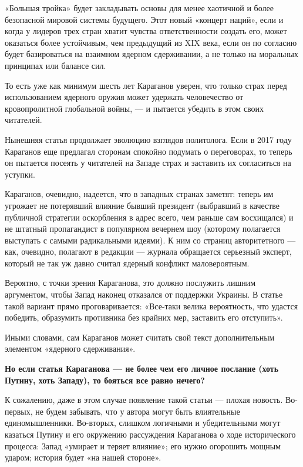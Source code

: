 \begin{fancyquotes}
    «Большая тройка» будет закладывать основы для менее хаотичной и более безопасной мировой системы будущего. Этот новый «концерт наций», если и когда у лидеров трех стран хватит чувства ответственности создать его, может оказаться более устойчивым, чем предыдущий из XIX века, если он по согласию будет базироваться на взаимном ядерном сдерживании, а не только на моральных принципах или балансе сил.
\end{fancyquotes}

То есть уже как минимум шесть лет Караганов уверен, что только страх перед использованием ядерного оружия может удержать человечество от кровопролитной глобальной войны, — и пытается убедить в этом своих читателей.

Нынешняя статья продолжает эволюцию взглядов политолога. Если в 2017 году Караганов еще предлагал сторонам спокойно подумать о переговорах, то теперь он пытается посеять у читателей на Западе страх и заставить их согласиться на уступки.

Караганов, очевидно, надеется, что в западных странах заметят: теперь им угрожает не потерявший влияние бывший президент (выбравший в качестве публичной стратегии оскорбления в адрес всего, чем раньше сам восхищался) и не штатный пропагандист в популярном вечернем шоу (которому полагается выступать с самыми радикальными идеями). К ним со страниц авторитетного — как, очевидно, полагают в редакции — журнала обращается серьезный эксперт, который не так уж давно считал ядерный конфликт маловероятным.

Вероятно, с точки зрения Караганова, это должно послужить лишним аргументом, чтобы Запад наконец отказался от поддержки Украины. В статье такой вариант прямо проговаривается: «Все-таки велика вероятность, что удастся победить, образумить противника без крайних мер, заставить его отступить».

Иными словами, сам Караганов может считать свой текст дополнительным элементом «ядерного сдерживания».

\textbf{Но если статья Караганова — не более чем его личное послание (хоть Путину, хоть Западу), то бояться все равно нечего?}

К сожалению, даже в этом случае появление такой статьи — плохая новость. Во-первых, не будем забывать, что у автора могут быть влиятельные единомышленники. Во-вторых, слишком логичными и убедительными могут казаться Путину и его окружению рассуждения Караганова о ходе исторического процесса: Запад «умирает и теряет влияние»; его нужно огорошить мощным ударом; история будет «на нашей стороне».

